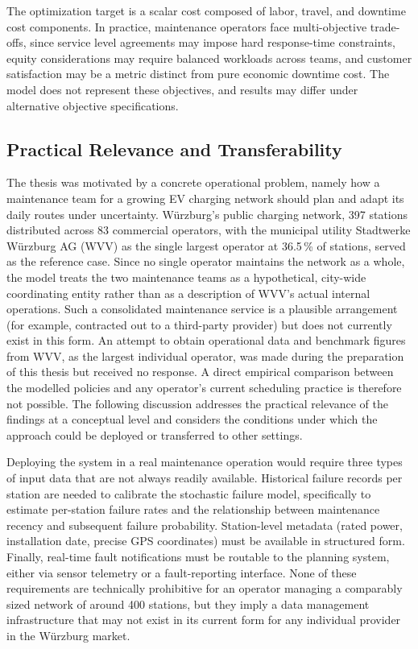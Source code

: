 \documentclass[12pt,oneside]{article}
\begin{document}
The optimization target is a scalar cost composed of labor, travel, and downtime cost components. In practice, maintenance operators face multi-objective trade-offs, since service level agreements may impose hard response-time constraints, equity considerations may require balanced workloads across teams, and customer satisfaction may be a metric distinct from pure economic downtime cost. The model does not represent these objectives, and results may differ under alternative objective specifications.

\subsection{Practical Relevance and Transferability}\label{subsec:practical_relevance}

The thesis was motivated by a concrete operational problem, namely how a maintenance team for a growing EV charging network should plan and adapt its daily routes under uncertainty. Würzburg's public charging network, 397 stations distributed across 83 commercial operators, with the municipal utility Stadtwerke Würzburg AG (WVV) as the single largest operator at 36.5\,\% of stations, served as the reference case. Since no single operator maintains the network as a whole, the model treats the two maintenance teams as a hypothetical, city-wide coordinating entity rather than as a description of WVV's actual internal operations. Such a consolidated maintenance service is a plausible arrangement (for example, contracted out to a third-party provider) but does not currently exist in this form. An attempt to obtain operational data and benchmark figures from WVV, as the largest individual operator, was made during the preparation of this thesis but received no response. A direct empirical comparison between the modelled policies and any operator's current scheduling practice is therefore not possible. The following discussion addresses the practical relevance of the findings at a conceptual level and considers the conditions under which the approach could be deployed or transferred to other settings.

Deploying the system in a real maintenance operation would require three types of input data that are not always readily available. Historical failure records per station are needed to calibrate the stochastic failure model, specifically to estimate per-station failure rates and the relationship between maintenance recency and subsequent failure probability. Station-level metadata (rated power, installation date, precise GPS coordinates) must be available in structured form. Finally, real-time fault notifications must be routable to the planning system, either via sensor telemetry or a fault-reporting interface. None of these requirements are technically prohibitive for an operator managing a comparably sized network of around 400 stations, but they imply a data management infrastructure that may not exist in its current form for any individual provider in the Würzburg market.
\end{document}
